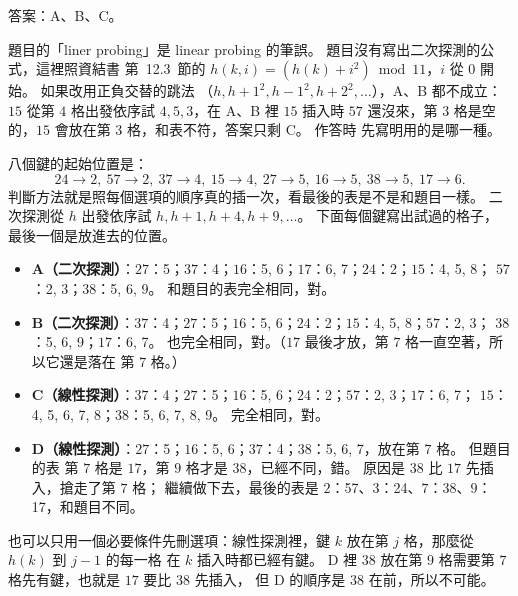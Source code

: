 \begin{pastsoln}
答案：A、B、C。

題目的「liner probing」是 linear probing 的筆誤。 題目沒有寫出二次探測的公式，這裡照資結書
第~12.3~節的 $h(k, i) = (h(k) + i^2) \bmod 11$，$i$ 從 $0$ 開始。 如果改用正負交替的跳法
（$h, h + 1^2, h - 1^2, h + 2^2, \ldots$），A、B 都不成立：$15$ 從第 $4$ 格出發依序試 $4, 5, 3$，在
A、B 裡 $15$ 插入時 $57$ 還沒來，第 $3$ 格是空的，$15$ 會放在第 $3$ 格，和表不符，答案只剩 C。 作答時
先寫明用的是哪一種。

八個鍵的起始位置是：
\[
24 \to 2,\ 57 \to 2,\ 37 \to 4,\ 15 \to 4,\ 27 \to 5,\ 16 \to 5,\ 38 \to 5,\ 17 \to 6 .
\]
判斷方法就是照每個選項的順序真的插一次，看最後的表是不是和題目一樣。 二次探測從 $h$ 出發依序試
$h, h + 1, h + 4, h + 9, \ldots$。 下面每個鍵寫出試過的格子，最後一個是放進去的位置。
\begin{itemize}
\item \textbf{A（二次探測）}：$27$：5；$37$：4；$16$：5, 6；$17$：6, 7；$24$：2；$15$：4, 5, 8；
$57$：2, 3；$38$：5, 6, 9。 和題目的表完全相同，對。
\item \textbf{B（二次探測）}：$37$：4；$27$：5；$16$：5, 6；$24$：2；$15$：4, 5, 8；$57$：2, 3；
$38$：5, 6, 9；$17$：6, 7。 也完全相同，對。（$17$ 最後才放，第 $7$ 格一直空著，所以它還是落在
第 $7$ 格。）
\item \textbf{C（線性探測）}：$37$：4；$27$：5；$16$：5, 6；$24$：2；$57$：2, 3；$17$：6, 7；
$15$：4, 5, 6, 7, 8；$38$：5, 6, 7, 8, 9。 完全相同，對。
\item \textbf{D（線性探測）}：$27$：5；$16$：5, 6；$37$：4；$38$：5, 6, 7，放在第 $7$ 格。 但題目的表
第 $7$ 格是 $17$，第 $9$ 格才是 $38$，已經不同，錯。 原因是 $38$ 比 $17$ 先插入，搶走了第 $7$ 格；
繼續做下去，最後的表是 $2$：57、$3$：24、$7$：38、$9$：17，和題目不同。
\end{itemize}
也可以只用一個必要條件先刪選項：線性探測裡，鍵 $k$ 放在第 $j$ 格，那麼從 $h(k)$ 到 $j - 1$ 的每一格
在 $k$ 插入時都已經有鍵。 D 裡 $38$ 放在第 $9$ 格需要第 $7$ 格先有鍵，也就是 $17$ 要比 $38$ 先插入，
但 D 的順序是 $38$ 在前，所以不可能。
\end{pastsoln}
